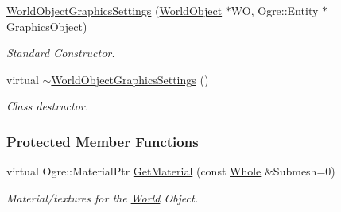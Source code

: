 \begin{DoxyCompactItemize}
\hyperlink{classMezzanine_1_1WorldObjectGraphicsSettings_a0000391cba0056b375dc324833ef747d}{WorldObjectGraphicsSettings} (\hyperlink{classMezzanine_1_1WorldObject}{WorldObject} $\ast$WO, Ogre::Entity $\ast$GraphicsObject)
\begin{DoxyCompactList}\small\item\em Standard Constructor. \item\end{DoxyCompactList}\item 
\hypertarget{classMezzanine_1_1WorldObjectGraphicsSettings_a72709c5d15de08cba37501510a87bfca}{
virtual \hyperlink{classMezzanine_1_1WorldObjectGraphicsSettings_a72709c5d15de08cba37501510a87bfca}{$\sim$WorldObjectGraphicsSettings} ()}
\label{classMezzanine_1_1WorldObjectGraphicsSettings_a72709c5d15de08cba37501510a87bfca}

\begin{DoxyCompactList}\small\item\em Class destructor. \item\end{DoxyCompactList}\end{DoxyCompactItemize}
\subsubsection*{Protected Member Functions}
\begin{DoxyCompactItemize}
\item 
\hypertarget{classMezzanine_1_1WorldObjectGraphicsSettings_a0580ad16e378357dfa47944097db9f80}{
virtual Ogre::MaterialPtr \hyperlink{classMezzanine_1_1WorldObjectGraphicsSettings_a0580ad16e378357dfa47944097db9f80}{GetMaterial} (const \hyperlink{namespaceMezzanine_adcbb6ce6d1eb4379d109e51171e2e493}{Whole} \&Submesh=0)}
\label{classMezzanine_1_1WorldObjectGraphicsSettings_a0580ad16e378357dfa47944097db9f80}

\begin{DoxyCompactList}\small\item\em Material/textures for the \hyperlink{classMezzanine_1_1World}{World} Object. \item\end{DoxyCompactList}\end{DoxyCompactItemize}
